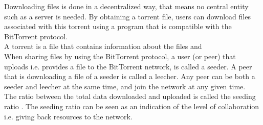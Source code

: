 Downloading files is done in a decentralized way, that means no central entity such as a server is needed.
By obtaining a torrent file, users can download files associated with this torrent using a program that is compatible with the BitTorrent protocol.\\

A torrent is a file that contains information about the files and \\

When sharing files by using the BitTorrent protocol, a user (or peer) that uploads i.e. provides a file to the BitTorrent network, is called a seeder.
A peer that is downloading a file of a seeder is called a leecher.
Any peer can be both a seeder and leecher at the same time, and join the network at any given time.\\

The ratio between the total data downloaded and uploaded is called the seeding ratio \cite{Cohen-bittorrent}.
The seeding ratio can be seen as an indication of the level of collaboration i.e. giving back resources to the network.\\



